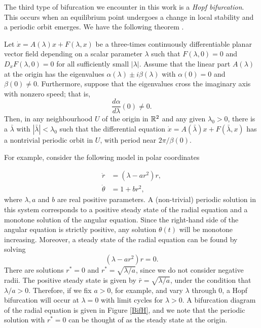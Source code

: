 \documentclass[12pt]{UOthesis}
\theoremstyle{remarkstyle}
\begin{document}
The third type of bifurcation we encounter in this work is a \textit{Hopf bifurcation}. This occurs when an equilibrium point undergoes a change in local stability and a periodic orbit emerges. We have the following theorem \cite{HaleKucak}.

\begin{theo}
	Let $\dot{x}=A(\lambda)x+F(\lambda,x)$ be a three-times continuously differentiable planar vector field depending on a scalar parameter $\lambda$ such that $F(\lambda,0)=0$ and $D_xF(\lambda,0)=0$ for all sufficiently small $|\lambda|$. Assume that the linear part $A(\lambda)$ at the origin has the eigenvalues $\alpha(\lambda)\pm i\beta(\lambda)$ with $\alpha(0)=0$ and $\beta(0)\ne 0$. Furthermore, suppose that the eigenvalues cross the imaginary axis with nonzero speed; that is,
	$$\frac{d\alpha}{d\lambda}(0)\ne 0.$$
	Then, in any neighbourhood $U$ of the origin in $\mathbb R^2$ and any given $\lambda_0>0$, there is a $\bar{\lambda}$ with $|\bar{\lambda}|<\lambda_0$ such that the differential equation $\dot{x}=A(\bar{\lambda})x+F(\bar{\lambda},x)$ has a nontrivial periodic orbit in $U$, with period near $2\pi/\beta(0)$.
	\label{TheoHopfBIf}
\end{theo}

For example, consider the following model in polar coordinates

\begin{equation}
	\begin{split}
		\dot{r}&=(\lambda-ar^2)r,\\
		\dot{\theta}&=1+br^2,
	\end{split}
	\label{VicHopfEg}
\end{equation}
where $\lambda,a$ and $b$ are real positive parameters. A (non-trivial) periodic solution in this system corresponds to a positive steady state of the radial equation and a monotone solution of the angular equation. Since the right-hand side of the angular equation is strictly positive, any solution $\theta(t)$ will be monotone increasing. Moreover, a steady state of the radial equation can be found by solving
$$(\lambda-ar^2)r=0.$$
There are solutions $r^*=0$ and $r^*=\sqrt{\lambda/a}$, since we do not consider negative radii. The positive steady state is given by $\bar{r}=\sqrt{\lambda/a}$, under the condition that $\lambda/a>0$. Therefore, if we fix $a>0$, for example, and vary $\lambda$ through 0, a Hopf bifurcation will occur at $\lambda=0$ with limit cycles for $\lambda>0$. A bifurcation diagram of the radial equation is given in Figure \ref{BifH}, and we note that the periodic solution with $r^*=0$ can be thought of as the steady state at the origin.\\
\end{document}
